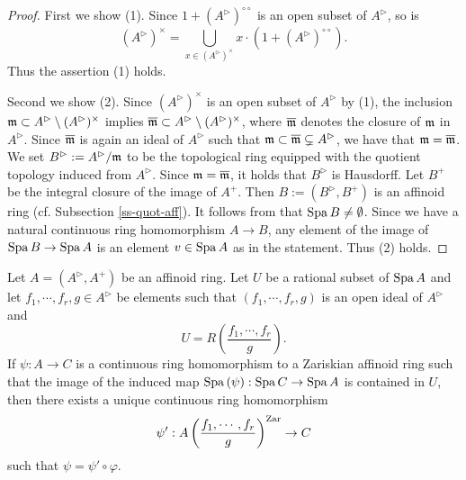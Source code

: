 \begin{proof}
First we show (1). 
Since $1+(A^{\rhd})^{\circ\circ}$ is an open subset of $A^{\rhd}$, 
so is 
$$(A^{\rhd})^{\times}=\bigcup_{x \in (A^{\rhd})^{\times}} x \cdot (1+(A^{\rhd})^{\circ\circ}).$$ 
Thus the assertion (1) holds. 

Second we show (2). 
Since $(A^{\rhd})^{\times}$ is an open subset of $A^{\rhd}$ by (1),  
the inclusion 
$\mathfrak{m} \subset A^{\rhd} \setminus (A^{\rhd})^{\times}$ 
implies 
$\overline{\mathfrak{m}} \subset A^{\rhd} \setminus (A^{\rhd})^{\times}$, 
where $\overline{\mathfrak{m}}$ denotes the closure of $\mathfrak{m}$ in $A^{\rhd}$. 
Since $\overline{\mathfrak{m}}$ is again an ideal of $A^{\rhd}$ 
such that $\mathfrak{m} \subset \overline{\mathfrak{m}} \subsetneq A^{\rhd}$, 
we have that $\mathfrak{m}=\overline{\mathfrak{m}}$. 
We set $B^{\rhd}:=A^{\rhd}/\mathfrak{m}$ to be the topological ring 
equipped with the quotient topology induced from $A^{\rhd}$. 
Since $\mathfrak{m}=\overline{\mathfrak{m}}$, it holds that $B^{\rhd}$ is Hausdorff. 
Let $B^+$ be the integral closure of the image of $A^+$. 
Then $B:= (B^{\rhd}, B^+)$ is an affinoid ring 
(cf. Subsection \ref{ss-quot-aff}). 
It follows from \cite[Proposition 3.6(i)]{Hub93} that 
${\operatorname{Spa}}\,B \neq \emptyset$. 
Since we have a natural continuous ring homomorphism $A \to B$, 
any element of the image of ${\operatorname{Spa}}\,B \to {\operatorname{Spa}}\,A$ 
is an element $v \in {\operatorname{Spa}}\,A$ as in the statement. 
Thus (2) holds. 
\end{proof}


\begin{lem}\label{l-rat-universal1}
Let $A=(A^{\rhd}, A^+)$ be an affinoid ring. 
Let $U$ be a rational subset of ${\operatorname{Spa}}\,A$ 
and let $f_1, \cdots, f_r, g \in A^{\rhd}$ be elements 
such that $(f_1, \cdots, f_r, g)$ is an open ideal of $A^{\rhd}$ and 
$$U=R\left(\frac{f_1, \cdots, f_r}{g}\right).$$
If $\psi:A \to C$ is a continuous ring homomorphism 
to a Zariskian affinoid ring 
such that the image of the induced map ${\operatorname{Spa}}\,(\psi):{\operatorname{Spa}}\,C \to {\operatorname{Spa}}\,A$ 
is contained in $U$,  
then there exists a unique continuous ring homomorphism 
$$\psi':A\left(\frac{f_1, \cdots, f_r}{g}\right)^{{\operatorname{Zar}}} \to C$$ 
such that $\psi=\psi' \circ \varphi$.  
\end{lem}

